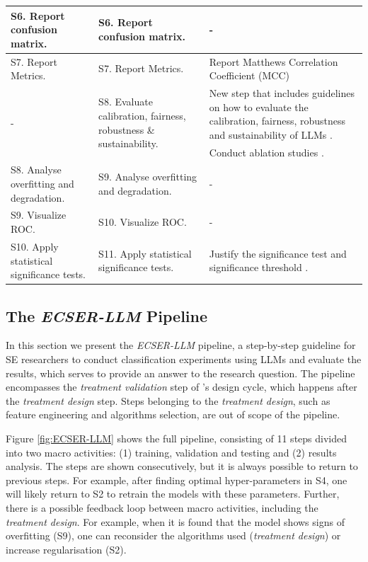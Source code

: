 \documentclass[a4paper]{article}
\newcommand{\newecser}{\textit{ECSER-LLM} }
\begin{document}
\begin{table}[H]
\begin{tabularx}{\textwidth}{|p{3cm}|p{3.5cm}|X|}
		S6. Report confusion matrix.
		& S6. Report confusion matrix.
		& - \\ \hline
		
		S7. Report Metrics.
		& S7. Report Metrics.
		&  Report Matthews Correlation Coefficient (MCC) \cite{Chicco2020,Foody2023,Yao2020} \\ \hline

		\multirow[c]{2}{*}{\parbox{3cm}{-}}
		& \multirow[c]{2}{*}{\parbox{3.5cm}{S8. Evaluate calibration, fairness, robustness \& sustainability.}}
		& New step that includes guidelines on how to evaluate the calibration, fairness, robustness and sustainability of LLMs  \cite{chang2023,liu2024}. \\ & & Conduct ablation studies \cite{meyes2019ablation}. \\ \hline
		
		S8. Analyse overfitting and degradation.
		& S9. Analyse overfitting and degradation.
		& - \\ \hline
		
		S9. Visualize ROC.
		& S10. Visualize ROC.
		& - \\ \hline
		
		S10. Apply statistical significance tests.
		& S11. Apply statistical significance tests.
		& Justify the significance test and significance threshold \cite{benjamin2018significance,amrhein2017significance}. \\ \hline
	\end{tabularx}
	\label{table:additions}
\end{table}


\subsection{The \newecser Pipeline}
\label{ECSER-LLM}
In this section we present the \newecser pipeline, a step-by-step guideline for SE researchers to conduct classification experiments using LLMs and evaluate the results, which serves to provide an answer to the research question. The pipeline encompasses the \textit{treatment validation} step of \textcite{Wieringa2014}'s design cycle, which happens after the \textit{treatment design} step. Steps belonging to the \textit{treatment design}, such as feature engineering and algorithms selection, are out of scope of the pipeline. 

Figure \ref{fig:ECSER-LLM} shows the full pipeline, consisting of 11 steps divided into two macro activities: (1) training, validation and testing and (2) results analysis. The steps are shown consecutively, but it is always possible to return to previous steps. For example, after finding optimal hyper-parameters in S4, one will likely return to S2 to retrain the models with these parameters. Further, there is a possible feedback loop between macro activities, including the \textit{treatment design}. For example, when it is found that the model shows signs of overfitting (S9), one can reconsider the algorithms used (\textit{treatment design}) or increase regularisation (S2).
\end{document}
